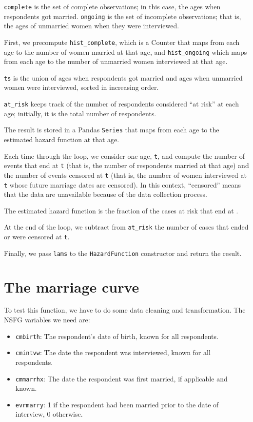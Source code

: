 \documentclass[12pt]{book}
\begin{document}
{\tt complete} is the set of complete observations; in this case,
the ages when respondents got married.  {\tt ongoing} is the set
of incomplete observations; that is, the ages of unmarried women
when they were interviewed.

First, we precompute \verb"hist_complete", which is a Counter
that maps from each age to the number of women married at that
age, and \verb"hist_ongoing" which maps from each age to the
number of unmarried women interviewed at that age.


{\tt ts} is the union of ages when respondents got married
and ages when unmarried women were interviewed, sorted in
increasing order.

\verb"at_risk" keeps track of the number of respondents considered
``at risk'' at each age; initially, it is the total number of
respondents.

The result is stored in a Pandas {\tt Series} that maps from
each age to the estimated hazard function at that age.

Each time through the loop, we consider one age, {\tt t},
and compute the number of events that end at {\tt t} (that is,
the number of respondents married at that age) and the number
of events censored at {\tt t} (that is, the number of women
interviewed at {\tt t} whose future marriage dates are
censored).  In this context, ``censored'' means that the
data are unavailable because of the data collection process.

The estimated hazard function is the fraction of the cases
at risk that end at {\tt}.

At the end of the loop, we subtract from \verb"at_risk" the
number of cases that ended or were censored at {\tt t}.

Finally, we pass {\tt lams} to the {\tt HazardFunction}
constructor and return the result.



\section{The marriage curve}

To test this function, we have to do some data cleaning and
transformation.  The NSFG variables we need are:

\begin{itemize}

\item {\tt cmbirth}: The respondent's date of birth, known for
all respondents.

\item {\tt cmintvw}: The date the respondent was interviewed,
known for all respondents.

\item {\tt cmmarrhx}: The date the respondent was first married,
if applicable and known.

\item {\tt evrmarry}: 1 if the respondent had been
married prior to the date of interview, 0 otherwise.

\end{itemize}
\end{document}
